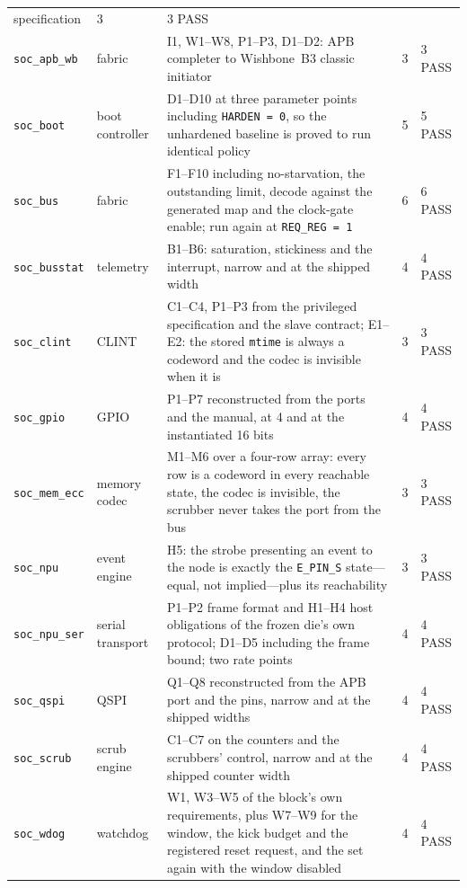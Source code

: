 \documentclass[11pt,a4paper]{article}
\newcommand{\file}[1]{\texttt{\small #1}}
\begin{document}
\begin{table}[p]
\begin{tabular}{L{2.7cm}L{1.7cm}L{7.0cm}rL{2.1cm}}
  specification & 3 & 3 PASS \\
\file{soc\_apb\_wb} & fabric &
  I1, W1--W8, P1--P3, D1--D2: APB completer to Wishbone~B3 classic
  initiator & 3 & 3 PASS \\
\file{soc\_boot} & boot controller &
  D1--D10 at three parameter points including \texttt{HARDEN = 0}, so
  the unhardened baseline is proved to run identical policy & 5 &
  5 PASS \\
\file{soc\_bus} & fabric &
  F1--F10 including no-starvation, the outstanding limit, decode
  against the generated map and the clock-gate enable; run again at
  \texttt{REQ\_REG = 1} & 6 & 6 PASS \\
\file{soc\_busstat} & telemetry &
  B1--B6: saturation, stickiness and the interrupt, narrow and at the
  shipped width & 4 & 4 PASS \\
\file{soc\_clint} & CLINT &
  C1--C4, P1--P3 from the privileged specification and the slave
  contract; E1--E2: the stored \texttt{mtime} is always a codeword and
  the codec is invisible when it is & 3 & 3 PASS \\
\file{soc\_gpio} & GPIO &
  P1--P7 reconstructed from the ports and the manual, at \num{4} and at
  the instantiated \num{16} bits & 4 & 4 PASS \\
\file{soc\_mem\_ecc} & memory codec &
  M1--M6 over a four-row array: every row is a codeword in every
  reachable state, the codec is invisible, the scrubber never takes the
  port from the bus & 3 & 3 PASS \\
\file{soc\_npu} & event engine &
  H5: the strobe presenting an event to the node is exactly the
  \texttt{E\_PIN\_S} state---equal, not implied---plus its
  reachability & 3 & 3 PASS \\
\file{soc\_npu\_ser} & serial transport &
  P1--P2 frame format and H1--H4 host obligations of the frozen die's
  own protocol; D1--D5 including the frame bound; two rate points &
  4 & 4 PASS \\
\file{soc\_qspi} & QSPI &
  Q1--Q8 reconstructed from the APB port and the pins, narrow and at
  the shipped widths & 4 & 4 PASS \\
\file{soc\_scrub} & scrub engine &
  C1--C7 on the counters and the scrubbers' control, narrow and at the
  shipped counter width & 4 & 4 PASS \\
\file{soc\_wdog} & watchdog &
  W1, W3--W5 of the block's own requirements, plus W7--W9 for the
  window, the kick budget and the registered reset request, and the set
  again with the window disabled &
  4 & 4 PASS \\

\end{tabular}
\end{table}
\end{document}
